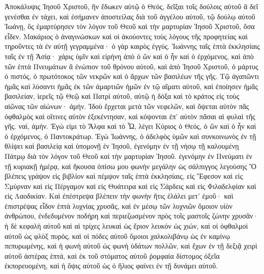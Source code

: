 \begin{pages}
    \begin{Rightside}
        \beginnumbering
		Ἀποκάλυψις Ἰησοῦ Χριστοῦ, ἣν ἔδωκεν αὐτῷ ὁ Θεός, δεῖξαι τοῖς δούλοις αὐτοῦ ἃ δεῖ γενέσθαι ἐν τάχει, καὶ ἐσήμανεν ἀποστείλας διὰ τοῦ ἀγγέλου αὐτοῦ, τῷ δούλῳ αὐτοῦ Ἰωάνῃ, ὃς ἐμαρτύρησεν τὸν λόγον τοῦ Θεοῦ καὶ τὴν μαρτυρίαν Ἰησοῦ Χριστοῦ, ὅσα εἶδεν. Μακάριος ὁ ἀναγινώσκων καὶ οἱ ἀκούοντες τοὺς λόγους τῆς προφητείας καὶ τηροῦντες τὰ ἐν αὐτῇ γεγραμμένα· ὁ γὰρ καιρὸς ἐγγύς.
		\pend
		\pstart
			Ἰωάννης ταῖς ἑπτὰ ἐκκλησίαις ταῖς ἐν τῇ Ἀσίᾳ· χάρις ὑμῖν καὶ εἰρήνη ἀπὸ ὁ ὢν καὶ ὁ ἦν καὶ ὁ ἐρχόμενος, καὶ ἀπὸ τῶν ἑπτὰ Πνευμάτων ἃ ἐνώπιον τοῦ θρόνου αὐτοῦ, καὶ ἀπὸ Ἰησοῦ Χριστοῦ, ὁ μάρτυς ὁ πιστός, ὁ πρωτότοκος τῶν νεκρῶν καὶ ὁ ἄρχων τῶν βασιλέων τῆς γῆς.
		\pend
		\pstart
			Τῷ ἀγαπῶντι ἡμᾶς καὶ λύσαντι ἡμᾶς ἐκ τῶν ἁμαρτιῶν ἡμῶν ἐν τῷ αἵματι αὐτοῦ, καὶ ἐποίησεν ἡμᾶς βασιλείαν, ἱερεῖς τῷ Θεῷ καὶ Πατρὶ αὐτοῦ, αὐτῷ ἡ δόξα καὶ τὸ κράτος εἰς τοὺς αἰῶνας τῶν αἰώνων· ἀμήν.
		\pend
		\pstart	
			Ἰδοὺ ἔρχεται μετὰ τῶν νεφελῶν, καὶ ὄψεται αὐτὸν πᾶς ὀφθαλμὸς καὶ οἵτινες αὐτὸν ἐξεκέντησαν, καὶ κόψονται ἐπ’ αὐτὸν πᾶσαι αἱ φυλαὶ τῆς γῆς. ναί, ἀμήν.
		\pend
		\pstart
			Ἐγώ εἰμι τὸ Ἄλφα καὶ τὸ Ὦ, λέγει Κύριος ὁ Θεός, ὁ ὢν καὶ ὁ ἦν καὶ ὁ ἐρχόμενος, ὁ Παντοκράτωρ.		
			\pend
		\pstart
			Ἐγὼ Ἰωάννης, ὁ ἀδελφὸς ὑμῶν καὶ συνκοινωνὸς ἐν τῇ θλίψει καὶ βασιλείᾳ καὶ ὑπομονῇ ἐν Ἰησοῦ, ἐγενόμην ἐν τῇ νήσῳ τῇ καλουμένῃ Πάτμῳ διὰ τὸν λόγον τοῦ Θεοῦ καὶ τὴν μαρτυρίαν Ἰησοῦ. ἐγενόμην ἐν Πνεύματι ἐν τῇ κυριακῇ ἡμέρᾳ, καὶ ἤκουσα ὀπίσω μου φωνὴν μεγάλην ὡς σάλπιγγος λεγούσης Ὃ βλέπεις γράψον εἰς βιβλίον καὶ πέμψον ταῖς ἑπτὰ ἐκκλησίαις, εἰς Ἔφεσον καὶ εἰς Σμύρναν καὶ εἰς Πέργαμον καὶ εἰς Θυάτειρα καὶ εἰς Σάρδεις καὶ εἰς Φιλαδελφίαν καὶ εἰς Λαοδικίαν. 
		\pend
		\pstart
			Καὶ ἐπέστρεψα βλέπειν τὴν φωνὴν ἥτις ἐλάλει μετ’ ἐμοῦ· καὶ ἐπιστρέψας εἶδον ἑπτὰ λυχνίας χρυσᾶς, καὶ ἐν μέσῳ τῶν λυχνιῶν ὅμοιον υἱὸν ἀνθρώπου, ἐνδεδυμένον ποδήρη καὶ περιεζωσμένον πρὸς τοῖς μαστοῖς ζώνην χρυσᾶν· ἡ δὲ κεφαλὴ αὐτοῦ καὶ αἱ τρίχες λευκαὶ ὡς ἔριον λευκόν ὡς χιών, καὶ οἱ ὀφθαλμοὶ αὐτοῦ ὡς φλὸξ πυρός, καὶ οἱ πόδες αὐτοῦ ὅμοιοι χαλκολιβάνῳ ὡς ἐν καμίνῳ πεπυρωμένης, καὶ ἡ φωνὴ αὐτοῦ ὡς φωνὴ ὑδάτων πολλῶν, καὶ ἔχων ἐν τῇ δεξιᾷ χειρὶ αὐτοῦ ἀστέρας ἑπτά, καὶ ἐκ τοῦ στόματος αὐτοῦ ῥομφαία δίστομος ὀξεῖα ἐκπορευομένη, καὶ ἡ ὄψις αὐτοῦ ὡς ὁ ἥλιος φαίνει ἐν τῇ δυνάμει αὐτοῦ. 

\end{Rightside}
\end{pages}
